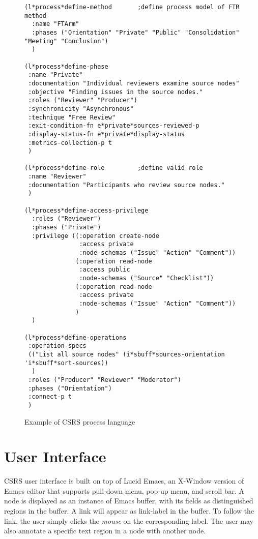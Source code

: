 \begin{figure}[tp]
  \footnotesize
  \begin{verbatim}
(l*process*define-method       ;define process model of FTR method
  :name "FTArm"                
  :phases ("Orientation" "Private" "Public" "Consolidation" "Meeting" "Conclusion")
  )

(l*process*define-phase
 :name "Private"
 :documentation "Individual reviewers examine source nodes"
 :objective "Finding issues in the source nodes."
 :roles ("Reviewer" "Producer")
 :synchronicity "Asynchronous"
 :technique "Free Review"
 :exit-condition-fn e*private*sources-reviewed-p
 :display-status-fn e*private*display-status
 :metrics-collection-p t
 )

(l*process*define-role         ;define valid role
 :name "Reviewer"
 :documentation "Participants who review source nodes."
 )

(l*process*define-access-privilege 
  :roles ("Reviewer")
  :phases ("Private")
  :privilege ((:operation create-node 
               :access private 
               :node-schemas ("Issue" "Action" "Comment"))
              (:operation read-node 
               :access public 
               :node-schemas ("Source" "Checklist"))
              (:operation read-node
               :access private
               :node-schemas ("Issue" "Action" "Comment"))
              )
  )

(l*process*define-operations
 :operation-specs 
 (("List all source nodes" (i*sbuff*sources-orientation 'i*sbuff*sort-sources))
  )
 :roles ("Producer" "Reviewer" "Moderator")
 :phases ("Orientation")
 :connect-p t
 )

  \end{verbatim}
  \normalsize
  \caption{Example of CSRS process language}
  \label{fig:process-language}
\end{figure}


\section{User Interface}

CSRS user interface is built on top of Lucid Emacs, an X-Window
version of Emacs editor that supports pull-down menu, pop-up menu, and
scroll bar. A node is displayed as an instance of Emacs
buffer, with its fields as distinguished regions in the buffer. A link
will appear as link-label in the buffer. To follow the link, the user
simply clicks the {\it mouse} on the corresponding label. The
user may also annotate a 
specific text region in a node with another node.

